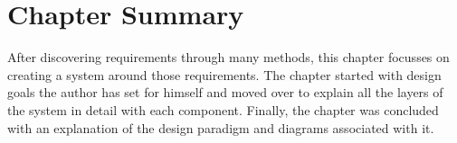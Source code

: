 \section{Chapter Summary}

After discovering requirements through many methods, this chapter focusses on creating a system around those requirements. The chapter started with design goals the author has set for himself and moved over to explain all the layers of the system in detail with each component. Finally, the chapter was concluded with an explanation of the design paradigm and diagrams associated with it.

